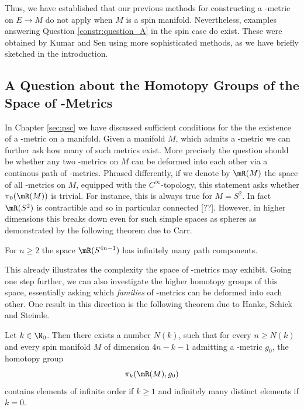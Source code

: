 Thus, we have established that our previous methods for constructing a \psc-metric on $E \to M$ do not apply when $M$ is a spin manifold. Nevertheless, examples answering Question \ref{constr:question_A} in the spin case do exist. These were obtained by Kumar and Sen \cite{kumar2025circle} using more sophisticated methods, as we have briefly sketched in the introduction.


\subsection{A Question about the Homotopy Groups of the Space of \psc-Metrics}

In Chapter \ref{sec:psc} we have discussed sufficient conditions for the the existence of a \psc-metric on a manifold. Given a manifold $M$, which admits a \psc-metric we can further ask how many of such metrics exist. More precisely the question should be whether any two \psc-metrics on $M$ can be deformed into each other via a continous path of \psc-metrics. Phrased differently, if we denote by $\mR(M)$ the space of all \psc-metrics on $M$, equipped with the $C^\infty$-topology, this statement asks whether $\pi_0(\mR(M))$ is trivial. For instance, this is always true for $M = S^2$. In fact $\mR(S^2)$ is contractible and so in particular connected [??]. However, in higher dimensions this breaks down even for such simple spaces as spheres as demonstrated by the following theorem due to Carr.

\begin{theorem}
	\label{further_questions:thm:carr}
	For $n \geq 2$ the space $\mR(S^{4n-1})$ has infinitely many path components.
\end{theorem}

This already illustrates the complexity the space of \psc-metrics may exhibit. Going one step further, we can also investigate the higher homotopy groups of this space, essentially asking which \emph{families} of \psc-metrics can be deformed into each other. One result in this direction is the following theorem due to Hanke, Schick and Steimle.

\begin{theorem}
	Let $k \in \N_0$. Then there exists a number $N(k)$, such that for every $n \geq N(k)$ and every spin manifold $M$ of dimension $4n - k - 1$ admitting a \psc-metric $g_0$, the homotopy group 
	\[
	\pi_k(\mR(M), g_0)
	\]
	contains elements of infinite order if $k \geq 1$ and infinitely many distinct elements if $k=0$.
\end{theorem}

